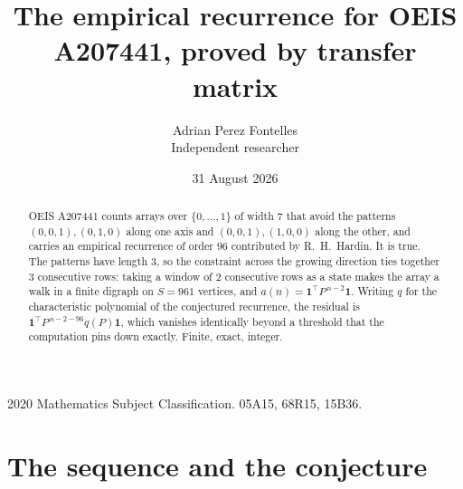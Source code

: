 \documentclass[11pt,a4paper]{article}
\title{The empirical recurrence for OEIS A207441, proved by transfer matrix}
\author{Adrian Perez Fontelles\\ \small Independent researcher}
\date{31 August 2026}
\theoremstyle{plain}
\theoremstyle{definition}
\begin{document}
\maketitle

\begin{abstract}
OEIS A207441 counts arrays over $\{0,\dots,1\}$ of width $7$ that avoid the patterns
$(0,0,1), (0,1,0)$ along one axis and $(0,0,1), (1,0,0)$ along the other, and carries an empirical recurrence of
order $96$ contributed by R.~H.~Hardin. It is true. The patterns have length $3$, so
the constraint across the growing direction ties together $3$ consecutive rows: taking a
window of $2$ consecutive rows as a state makes the array a walk in a finite digraph
on $S=961$ vertices, and $a(n)=\mathbf{1}^{\!\top}P^{\,n-2}\mathbf{1}$. Writing $q$
for the characteristic polynomial of the conjectured recurrence, the residual is
$\mathbf{1}^{\!\top}P^{\,n-2-96}q(P)\mathbf{1}$, which vanishes identically
beyond a threshold that the computation pins down exactly. Finite, exact, integer.
\end{abstract}

\noindent\small 2020 Mathematics Subject Classification. 05A15, 68R15, 15B36.\normalsize

\section{The sequence and the conjecture}
\end{document}
